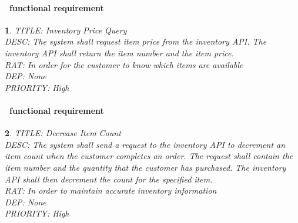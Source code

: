 \documentclass{scrreprt}
\theoremstyle{funreq}
\newtheorem{funreq}{}
\newcommand*{\reqref}[1]{\hyperref[#1]{FR\ref*{#1}}}
\begin{document}
	\paragraph[]{\Subsectionname ~functional requirement }
	\begin{funreq}
		\label{inventory_price}
		TITLE: Inventory Price Query\\
		DESC: The system shall request item price from the inventory API.  The inventory API shall return the item number and the item price.\\
		RAT: In order for the customer to know which items are available\\
		DEP: None\\
		PRIORITY: High\\
	\end{funreq}

	\paragraph[]{\Subsectionname ~functional requirement }
	\begin{funreq}
		\label{inventory_decrement}
		TITLE: Decrease Item Count\\
		DESC: The system shall send a request to the inventory API to decrement an item count when the customer completes an order.  The request shall contain the item number and the quantity that the customer has purchased.  The inventory API shall then decrement the count for the specified item.\\
		RAT: In order to maintain accurate inventory information\\
		DEP: None\\
		PRIORITY: High\\
	\end{funreq}

	
\end{document}
